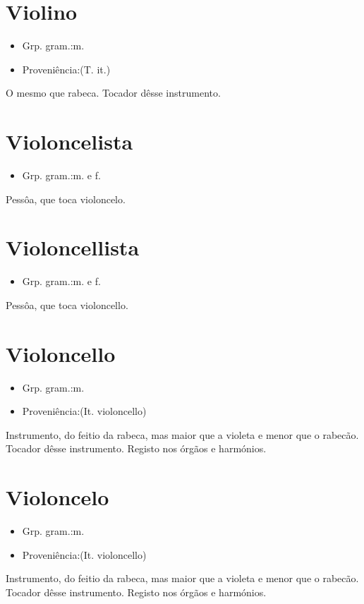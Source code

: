 \documentclass{article}
\begin{document}
\section{Violino}
\begin{itemize}
\item {Grp. gram.:m.}
\end{itemize}
\begin{itemize}
\item {Proveniência:(T. it.)}
\end{itemize}
O mesmo que \textunderscore rabeca\textunderscore .
Tocador dêsse instrumento.
\section{Violoncelista}
\begin{itemize}
\item {Grp. gram.:m.  e  f.}
\end{itemize}
Pessôa, que toca violoncelo.
\section{Violoncellista}
\begin{itemize}
\item {Grp. gram.:m.  e  f.}
\end{itemize}
Pessôa, que toca violoncello.
\section{Violoncello}
\begin{itemize}
\item {Grp. gram.:m.}
\end{itemize}
\begin{itemize}
\item {Proveniência:(It. \textunderscore violoncello\textunderscore )}
\end{itemize}
Instrumento, do feitio da rabeca, mas maior que a violeta e menor que o rabecão.
Tocador dêsse instrumento.
Registo nos órgãos e harmónios.
\section{Violoncelo}
\begin{itemize}
\item {Grp. gram.:m.}
\end{itemize}
\begin{itemize}
\item {Proveniência:(It. \textunderscore violoncello\textunderscore )}
\end{itemize}
Instrumento, do feitio da rabeca, mas maior que a violeta e menor que o rabecão.
Tocador dêsse instrumento.
Registo nos órgãos e harmónios.
\end{document}
